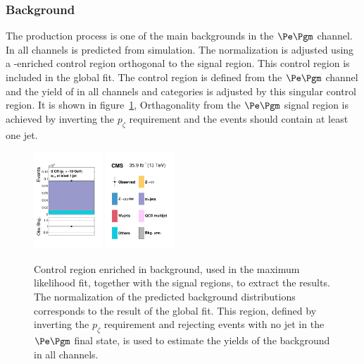 \subsubsection{\ttbar Background}
The \ttbar production process is one of the main backgrounds in the $\Pe\Pgm$ channel.
In all channels \ttbar is predicted from simulation. The normalization is adjusted using
a \ttbar-enriched control region orthogonal to the signal region. This control region is included
in the global fit. The control region is defined from the $\Pe\Pgm$ channel and the yield
of \ttbar in all channels and categories is adjusted by this singular \ttbar control region.
It is shown in figure~\ref{fig:htt_ttbar_CR2},
Orthagonality from the $\Pe\Pgm$ signal region is achieved by inverting the $p_\zeta$ requirement
and the events should contain at least one jet.

\begin{figure}[htb]
\centering
     \includegraphics[width=0.23\textwidth]{higgs_to_taus/plots/Figure_005-a.pdf}
     \includegraphics[width=0.23\textwidth]{higgs_to_taus/plots/Figure_005-b.pdf}
     \caption{Control region enriched in \ttbar background, used in the maximum likelihood fit, 
together with the signal regions, to extract the results. The normalization of the predicted background 
distributions corresponds to the result of the global fit. This region, defined by inverting the 
$p_\zeta$ requirement and rejecting events with no jet in the $\Pe\Pgm$ final state, is used to estimate the
yields of the \ttbar background in all channels.}
     \label{fig:htt_ttbar_CR2}
\end{figure}

